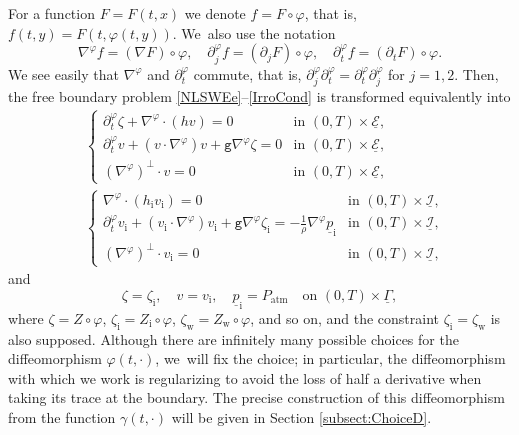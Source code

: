 \documentclass[JEP,XML,SOM,Unicode,NoFloatCountersInSection,published]{cedram}
\newcommand{\gr}{{\mathtt g}}
\newcommand{\dt}{\partial_t}
\newcommand{\cI}{{\mathcal I}}
\newcommand{\cE}{{\mathcal E}}
\newcommand{\ul}[1]{\underline{#1}}
\newcommand{\itGamma}{\mathit{\Gamma}}
\theoremstyle{definition}
\begin{document}
For a function $F=F(t,x)$ we denote $f=F\circ\varphi$, that is, $f(t,y)=F(t,\varphi(t,y))$. We~also use the notation
\begin{equation}\label{DiffOP}
\nabla^\varphi f=(\nabla F)\circ\varphi, \quad \partial_j^\varphi f=(\partial_j F)\circ\varphi,
\quad \dt^\varphi f=(\dt F)\circ\varphi.
\end{equation}
We see easily that $\nabla^\varphi$ and $\dt^\varphi$ commute, that is, $\partial_j^\varphi \dt^\varphi = \dt^\varphi \partial_j^\varphi$ for $j=1,2$.
Then, the free boundary problem \eqref{NLSWEe}--\eqref{IrroCond} is transformed equivalently into
\begin{align}\label{nlswe}
&\begin{cases}
\dt^\varphi\zeta+\nabla^\varphi\cdot(hv) = 0 &\text{in } (0,T)\times\ul{\cE}, \\
\dt^\varphi v+(v\cdot\nabla^\varphi)v+\gr\nabla^\varphi \zeta = 0 &\text{in } (0,T)\times\ul{\cE}, \\
(\nabla^\varphi)^\perp\cdot v=0 &\text{in } (0,T)\times\ul{\cE},
\end{cases}
\\
\label{nlswi}
&\begin{cases}
\nabla^\varphi\cdot(h_\mathrm{i}v_\mathrm{i}) = 0 &\text{in } (0,T)\times\ul{\cI}, \\
\dt^\varphi v_\mathrm{i}+(v_\mathrm{i}\cdot\nabla^\varphi)v_\mathrm{i}+\gr\nabla^\varphi \zeta_\mathrm{i}
= -\frac{1}{\rho}\nabla^\varphi\ul{p}_\mathrm{i} &\text{in } (0,T)\times\ul{\cI}, \\
(\nabla^\varphi)^\perp\cdot v_\mathrm{i}=0 &\text{in } (0,T)\times\ul{\cI},
\end{cases}
\end{align}
and
\begin{equation}\label{mc}
\zeta=\zeta_\mathrm{i}, \quad v=v_\mathrm{i}, \quad \ul{p}_\mathrm{i}=P_\mathrm{atm} \quad\text{on } (0,T)\times\ul{\itGamma},
\end{equation}
where $\zeta=Z\circ\varphi$, $\zeta_\mathrm{i}=Z_\mathrm{i}\circ\varphi$, $\zeta_\mathrm{w}=Z_\mathrm{w}\circ\varphi$, and so on,
and the constraint $\zeta_\mathrm{i}=\zeta_\mathrm{w}$ is also supposed.
Although there are infinitely many possible choices for the diffeomorphism $\varphi(t,\cdot)$, we~will fix the choice;
in particular, the diffeomorphism with which we work is regularizing to avoid the loss of half a derivative when taking its trace at the boundary.
The precise construction of this diffeomorphism from the function $\gamma(t,\cdot)$ will be given in Section \ref{subsect:ChoiceD}.
\end{document}
